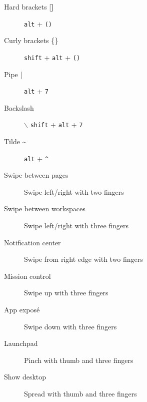 \documentclass[12pt, a4paper]{article}
\begin{document}
\begin{multicols}{3}
	\columnbreak

	
	\begin{description}
		\item[Hard brackets [\textbf{]}] \hfill \texttt{alt} + \texttt{()}
		\item[Curly brackets \{\}] \hfill \texttt{shift} + \texttt{alt} + \texttt{()}
		\item[] 
		\item[Pipe |] \hfill \texttt{alt} + \texttt{7}
		\item[Backslash] $\mathbf{\backslash}$ \hfill \texttt{shift} + \texttt{alt} + \texttt{7}
		\item[] 
		\item[Tilde \~] \hfill \texttt{alt} + \texttt{\^} 
		\item[] 
		\item[] 
		\item[] 
		\item[] 
		\item[] 
		\item[] 
		\item[] 
		\item[] 
		\item[] 
		\item[] 
	\end{description}

	\columnbreak
	
	
	\begin{description}
		\item[Swipe between pages] \hfill Swipe left/right with two fingers
		\item[Swipe between workspaces] \hfill Swipe left/right with three fingers
		\item[Notification center] \hfill Swipe from right edge with two fingers
		\item[Mission control] \hfill Swipe up with three fingers
		\item[App exposé] \hfill Swipe down with three fingers
		\item[Launchpad] \hfill Pinch with thumb and three fingers 
		\item[Show desktop] \hfill Spread with thumb and three fingers
		\item[] 
		\item[] 
		\item[] 
		\item[] 
		\item[] 
		\item[]
	\end{description}
\end{multicols}
\end{document}
